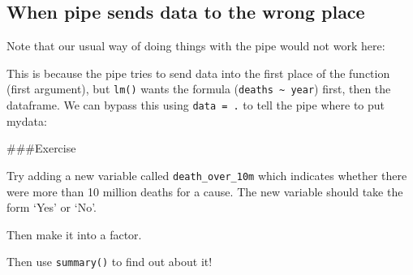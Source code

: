 \documentclass[]{book}
\makeatletter
\newenvironment{Shaded}{\begin{snugshade}}{\end{snugshade}}
\newcommand{\CommentTok}[1]{\textcolor[rgb]{0.56,0.35,0.01}{\textit{#1}}}
\newcommand{\DataTypeTok}[1]{\textcolor[rgb]{0.13,0.29,0.53}{#1}}
\newcommand{\DecValTok}[1]{\textcolor[rgb]{0.00,0.00,0.81}{#1}}
\newcommand{\KeywordTok}[1]{\textcolor[rgb]{0.13,0.29,0.53}{\textbf{#1}}}
\newcommand{\NormalTok}[1]{#1}
\newcommand{\OperatorTok}[1]{\textcolor[rgb]{0.81,0.36,0.00}{\textbf{#1}}}
\newcommand{\StringTok}[1]{\textcolor[rgb]{0.31,0.60,0.02}{#1}}
\newenvironment{kframe}{%
\medskip{}
\setlength{\fboxsep}{.8em}
 \def\at@end@of@kframe{}%
 \ifinner\ifhmode%
  \def\at@end@of@kframe{\end{minipage}}%
  \begin{minipage}{\columnwidth}%
 \fi\fi%
 \def\FrameCommand##1{\hskip\@totalleftmargin \hskip-\fboxsep
 \colorbox{shadecolor}{##1}\hskip-\fboxsep
     \hskip-\linewidth \hskip-\@totalleftmargin \hskip\columnwidth}%
 \MakeFramed {\advance\hsize-\width
   \@totalleftmargin\z@ \linewidth\hsize
   \@setminipage}}%
 {\par\unskip\endMakeFramed%
 \at@end@of@kframe}
\renewenvironment{Shaded}{\begin{kframe}}{\end{kframe}}
\theoremstyle{definition}
\theoremstyle{definition}
\theoremstyle{definition}
\theoremstyle{remark}
\makeatother
\begin{document}
\hypertarget{when-pipe-sends-data-to-the-wrong-place}{%
\subsection{When pipe sends data to the wrong
place}\label{when-pipe-sends-data-to-the-wrong-place}}

Note that our usual way of doing things with the pipe would not work
here:

\begin{Shaded}
\end{Shaded}

This is because the pipe tries to send data into the first place of the
function (first argument), but \texttt{lm()} wants the formula
(\texttt{deaths\ \textasciitilde{}\ year}) first, then the dataframe. We
can bypass this using \texttt{data\ =\ .} to tell the pipe where to put
mydata:

\begin{Shaded}
\end{Shaded}

\#\#\#Exercise

Try adding a new variable called \texttt{death\_over\_10m} which
indicates whether there were more than 10 million deaths for a cause.
The new variable should take the form `Yes' or `No'.

Then make it into a factor.

Then use \texttt{summary()} to find out about it!

\begin{Shaded}
\end{Shaded}
\end{document}
